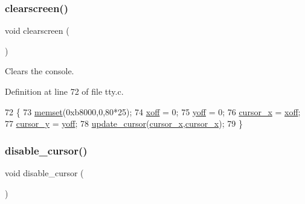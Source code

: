 \subsubsection{\texorpdfstring{clearscreen()}{clearscreen()}}
{\footnotesize\ttfamily void clearscreen (\begin{DoxyParamCaption}{ }\end{DoxyParamCaption})}



Clears the console. 



Definition at line 72 of file tty.\+c.


\begin{DoxyCode}
72                    \{
73     \hyperlink{a00110_a9e432f267691eceb2e2e0efcc37efbc9_a9e432f267691eceb2e2e0efcc37efbc9}{memset}(0xb8000,0,80*25);
74     \hyperlink{a00140_abaa0d20f0e52ce0d3a7d706f6ac16266_abaa0d20f0e52ce0d3a7d706f6ac16266}{xoff} = 0;
75     \hyperlink{a00140_a1a7539764d0ae8cd06ce45c62cf92bca_a1a7539764d0ae8cd06ce45c62cf92bca}{yoff} = 0;
76     \hyperlink{a00140_ae69604af0f9bd5fca2a016d0aa1ba7e1_ae69604af0f9bd5fca2a016d0aa1ba7e1}{cursor\_x} = \hyperlink{a00140_abaa0d20f0e52ce0d3a7d706f6ac16266_abaa0d20f0e52ce0d3a7d706f6ac16266}{xoff};
77     \hyperlink{a00140_a0301c5492919c401c2c1ecf52af709b0_a0301c5492919c401c2c1ecf52af709b0}{cursor\_y} = \hyperlink{a00140_a1a7539764d0ae8cd06ce45c62cf92bca_a1a7539764d0ae8cd06ce45c62cf92bca}{yoff};
78     \hyperlink{a00140_a492f5021d7340613e732ef37bbaa04e4_a492f5021d7340613e732ef37bbaa04e4}{update\_cursor}(\hyperlink{a00140_ae69604af0f9bd5fca2a016d0aa1ba7e1_ae69604af0f9bd5fca2a016d0aa1ba7e1}{cursor\_x},\hyperlink{a00140_ae69604af0f9bd5fca2a016d0aa1ba7e1_ae69604af0f9bd5fca2a016d0aa1ba7e1}{cursor\_x});
79 \}
\end{DoxyCode}
\mbox{\label{a00140_a3d09038c7b6436e60b228f2f3f451f6a_a3d09038c7b6436e60b228f2f3f451f6a}} 
\subsubsection{\texorpdfstring{disable\+\_\+cursor()}{disable\_cursor()}}
{\footnotesize\ttfamily void disable\+\_\+cursor (\begin{DoxyParamCaption}{ }\end{DoxyParamCaption})}




